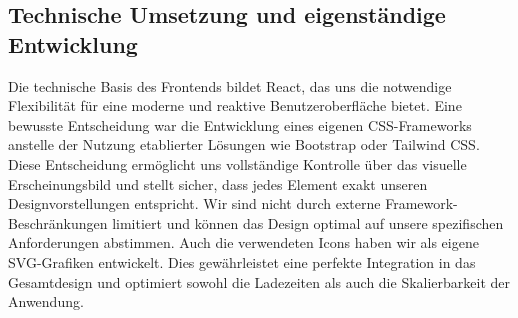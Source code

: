 \subsection{Technische Umsetzung und eigenständige Entwicklung}
Die technische Basis des Frontends bildet React, das uns die notwendige Flexibilität für eine
moderne und reaktive Benutzeroberfläche bietet. Eine bewusste Entscheidung war die
Entwicklung eines eigenen CSS-Frameworks anstelle der Nutzung etablierter Lösungen wie
Bootstrap oder Tailwind CSS.
Diese Entscheidung ermöglicht uns vollständige Kontrolle über das visuelle Erscheinungsbild
und stellt sicher, dass jedes Element exakt unseren Designvorstellungen entspricht. Wir sind
nicht durch externe Framework-Beschränkungen limitiert und können das Design optimal auf
unsere spezifischen Anforderungen abstimmen.
Auch die verwendeten Icons haben wir als eigene SVG-Grafiken entwickelt. Dies
gewährleistet eine perfekte Integration in das Gesamtdesign und optimiert sowohl die
Ladezeiten als auch die Skalierbarkeit der Anwendung.